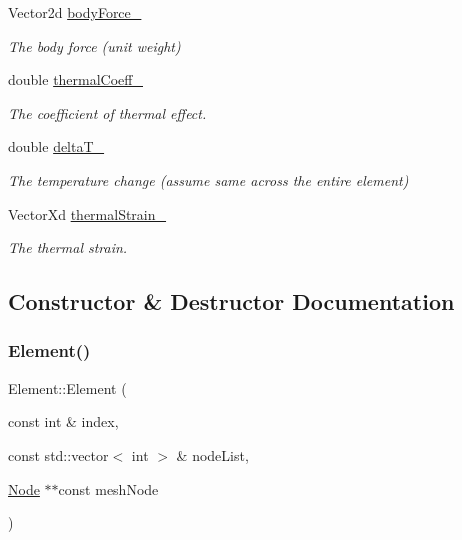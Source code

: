 \begin{DoxyCompactItemize}
Vector2d \mbox{\hyperlink{class_element_a95aee59c87f4d17911332c0309eae425}{body\+Force\+\_\+}}
\begin{DoxyCompactList}\small\item\em The body force (unit weight) \end{DoxyCompactList}\item 
\mbox{\label{class_element_a9fb09056b331918d55c52ef99c0bd664}} 
double \mbox{\hyperlink{class_element_a9fb09056b331918d55c52ef99c0bd664}{thermal\+Coeff\+\_\+}}
\begin{DoxyCompactList}\small\item\em The coefficient of thermal effect. \end{DoxyCompactList}\item 
\mbox{\label{class_element_a03e46bd18f0f4d621f1c6d6dfa41d9ae}} 
double \mbox{\hyperlink{class_element_a03e46bd18f0f4d621f1c6d6dfa41d9ae}{delta\+T\+\_\+}}
\begin{DoxyCompactList}\small\item\em The temperature change (assume same across the entire element) \end{DoxyCompactList}\item 
\mbox{\label{class_element_a6d8900826714f772a204cf8b2ccca39e}} 
Vector\+Xd \mbox{\hyperlink{class_element_a6d8900826714f772a204cf8b2ccca39e}{thermal\+Strain\+\_\+}}
\begin{DoxyCompactList}\small\item\em The thermal strain. \end{DoxyCompactList}\end{DoxyCompactItemize}


\subsection{Constructor \& Destructor Documentation}
\mbox{\label{class_element_a05c744ed2de597b38da74c7765f5ed1b}} 
\subsubsection{\texorpdfstring{Element()}{Element()}}
{\footnotesize\ttfamily Element\+::\+Element (\begin{DoxyParamCaption}\item[{const int \&}]{index,  }\item[{const std\+::vector$<$ int $>$ \&}]{node\+List,  }\item[{\mbox{\hyperlink{class_node}{Node}} $\ast$$\ast$const}]{mesh\+Node }\end{DoxyParamCaption})}



